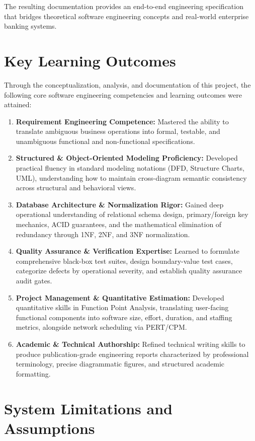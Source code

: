 The resulting documentation provides an end-to-end engineering specification that bridges theoretical software engineering concepts and real-world enterprise banking systems.

\section{Key Learning Outcomes}

Through the conceptualization, analysis, and documentation of this project, the following core software engineering competencies and learning outcomes were attained:

\begin{enumerate}
  \item \textbf{Requirement Engineering Competence:} Mastered the ability to translate ambiguous business operations into formal, testable, and unambiguous functional and non-functional specifications.
  \item \textbf{Structured \& Object-Oriented Modeling Proficiency:} Developed practical fluency in standard modeling notations (DFD, Structure Charts, UML), understanding how to maintain cross-diagram semantic consistency across structural and behavioral views.
  \item \textbf{Database Architecture \& Normalization Rigor:} Gained deep operational understanding of relational schema design, primary/foreign key mechanics, ACID guarantees, and the mathematical elimination of redundancy through 1NF, 2NF, and 3NF normalization.
  \item \textbf{Quality Assurance \& Verification Expertise:} Learned to formulate comprehensive black-box test suites, design boundary-value test cases, categorize defects by operational severity, and establish quality assurance audit gates.
  \item \textbf{Project Management \& Quantitative Estimation:} Developed quantitative skills in Function Point Analysis, translating user-facing functional components into software size, effort, duration, and staffing metrics, alongside network scheduling via PERT/CPM.
  \item \textbf{Academic \& Technical Authorship:} Refined technical writing skills to produce publication-grade engineering reports characterized by professional terminology, precise diagrammatic figures, and structured academic formatting.
\end{enumerate}

\section{System Limitations and Assumptions}

